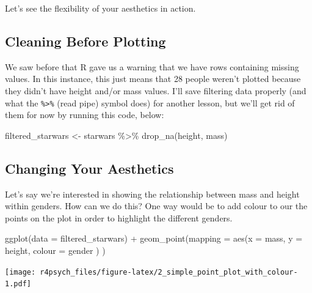 \documentclass[
]{book}
\newenvironment{Shaded}{\begin{snugshade}}{\end{snugshade}}
\newcommand{\AttributeTok}[1]{\textcolor[rgb]{0.77,0.63,0.00}{#1}}
\newcommand{\FunctionTok}[1]{\textcolor[rgb]{0.00,0.00,0.00}{#1}}
\newcommand{\NormalTok}[1]{#1}
\newcommand{\OtherTok}[1]{\textcolor[rgb]{0.56,0.35,0.01}{#1}}
\newcommand{\SpecialCharTok}[1]{\textcolor[rgb]{0.00,0.00,0.00}{#1}}
\begin{document}
Let's see the flexibility of your aesthetics in action.

\hypertarget{cleaning-before-plotting}{%
\subsection{Cleaning Before Plotting}\label{cleaning-before-plotting}}

We saw before that R gave us a warning that we have rows containing missing values. In this instance, this just means that 28 people weren't plotted because they didn't have height and/or mass values. I'll save filtering data properly (and what the \texttt{\%\textgreater{}\%} (read pipe) symbol does) for another lesson, but we'll get rid of them for now by running this code, below:

\begin{Shaded}
\begin{Highlighting}[]
\NormalTok{filtered\_starwars }\OtherTok{\textless{}{-}}\NormalTok{ starwars }\SpecialCharTok{\%\textgreater{}\%} 
  \FunctionTok{drop\_na}\NormalTok{(height, mass)}
\end{Highlighting}
\end{Shaded}

\hypertarget{changing-your-aesthetics}{%
\subsection{Changing Your Aesthetics}\label{changing-your-aesthetics}}

Let's say we're interested in showing the relationship between mass and height within genders. How can we do this? One way would be to add colour to our the points on the plot in order to highlight the different genders.

\begin{Shaded}
\begin{Highlighting}[]
\FunctionTok{ggplot}\NormalTok{(}\AttributeTok{data =}\NormalTok{ filtered\_starwars) }\SpecialCharTok{+}
  \FunctionTok{geom\_point}\NormalTok{(}\AttributeTok{mapping =} \FunctionTok{aes}\NormalTok{(}\AttributeTok{x =}\NormalTok{ mass, }
                           \AttributeTok{y =}\NormalTok{ height, }
                           \AttributeTok{colour =}\NormalTok{ gender}
\NormalTok{                           )}
\NormalTok{             )}
\end{Highlighting}
\end{Shaded}

\texttt{[image: r4psych\_files/figure-latex/2\_simple\_point\_plot\_with\_colour-1.pdf]}
\end{document}
